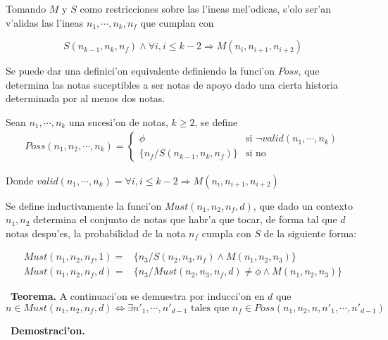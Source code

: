 Tomando $M$ y $S$ como restricciones sobre las l'ineas mel'odicas, s'olo ser'an v'alidas las l'ineas $n_1, \cdots, n_k, n_f$ que cumplan con

$$  S(n_{k-1}, n_k, n_f) \land \forall i, i\leq k-2 \Rightarrow M(n_i, n_{i+1}, n_{i+2})$$

Se puede dar una definici'on equivalente definiendo la funci'on $Poss$, que determina las notas suceptibles a ser notas de apoyo dado una cierta historia determinada por al menos dos notas.

\begin{definition}
\label{def:poss}
Sean $n_1, \cdots, n_k$ una sucesi'on de notas, $k\geq2$, se define
\begin{align*}
Poss(n_1, n_2, \cdots, n_k)= \left\{
 \begin{array}{rl}
  \phi & \text{si } \neg valid(n_1, \cdots, n_k) \\ %
   \{n_f / S(n_{k-1}, n_k, n_f)\} & \text{si no}
 \end{array} \right.
\end{align*}

Donde $valid(n_1, \cdots, n_k) = \forall i, i\leq k-2 \Rightarrow M(n_i, n_{i+1}, n_{i+2})$
\end{definition}

Se define inductivamente la funci'on $Must(n_1, n_2, n_f, d)$, que dado un contexto $n_1, n_2$ determina el conjunto de notas que habr'a que tocar, de forma tal
que $d$ notas despu'es, la probabilidad de la nota $n_f$ cumpla con $S$ de la siguiente forma:
\begin{definition}
\label{def:must}
\begin{align*}
Must(n_1, n_2, n_f, 1)=& \{n_3/ S(n_2, n_3, n_f) \land M(n_1, n_2, n_3)\}\\
Must(n_1, n_2, n_f, d)=& \{n_3/ Must(n_2, n_3, n_f, d) \neq \phi \land M(n_1,n_2, n_3)\}
\end{align*}
\end{definition}


\ \newline \textbf{Teorema.}
A continuaci'on se demuestra por inducci'on en $d$ que 
$$n \in Must(n_1, n_2, n_f, d) \Leftrightarrow \exists n'_1, \cdots, n'_{d-1} \text{ tales que } n_f \in Poss(n_1, n_2, n, n'_1, \cdots, n'_{d-1})$$

\ \newline \textbf{Demostraci'on.}

